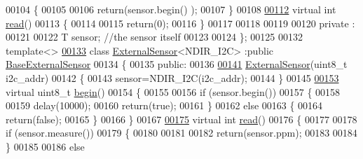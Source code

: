 \begin{DoxyCode}
00104     \{
00105 
00106         \textcolor{keywordflow}{return}(sensor.begin() );    
00107     \}
00108     
\hyperlink{class_external_sensor_a6dbf2d6b1c183740ce0f153d6e43ccb2}{00112}     \textcolor{keyword}{virtual} \textcolor{keywordtype}{int} \hyperlink{class_external_sensor_a6dbf2d6b1c183740ce0f153d6e43ccb2}{read}()
00113     \{
00114 
00115         \textcolor{keywordflow}{return}(0);
00116     \}
00117 
00118 
00119 
00120 private :
00121     
00122     T sensor; \textcolor{comment}{//the sensor itself}
00123 
00124 \};
00125 
00132 \textcolor{keyword}{template}<>
\hyperlink{class_external_sensor_3_01_n_d_i_r___i2_c_01_4}{00133} \textcolor{keyword}{class }\hyperlink{class_external_sensor}{ExternalSensor}<NDIR\_I2C> :\textcolor{keyword}{public} \hyperlink{class_base_external_sensor}{BaseExternalSensor}
00134 \{
00135 \textcolor{keyword}{public}:
00136 
\hyperlink{class_external_sensor_3_01_n_d_i_r___i2_c_01_4_aa06970ea689679c0e1deb5360e05a0a4}{00141}     \hyperlink{class_external_sensor_3_01_n_d_i_r___i2_c_01_4_aa06970ea689679c0e1deb5360e05a0a4}{ExternalSensor}(uint8\_t i2c\_addr)
00142     \{
00143         sensor=NDIR\_I2C(i2c\_addr);
00144     \}
00145     
\hyperlink{class_external_sensor_3_01_n_d_i_r___i2_c_01_4_ac6f3614d94968ef0cc11b2b4d69cef03}{00153}     \textcolor{keyword}{virtual} uint8\_t \hyperlink{class_external_sensor_3_01_n_d_i_r___i2_c_01_4_ac6f3614d94968ef0cc11b2b4d69cef03}{begin}()
00154     \{
00155 
00156          \textcolor{keywordflow}{if} (sensor.begin()) 
00157         \{
00158 
00159             delay(10000);
00160             \textcolor{keywordflow}{return}(\textcolor{keyword}{true});
00161             \}
00162          \textcolor{keywordflow}{else} 
00163         \{
00164             \textcolor{keywordflow}{return}(\textcolor{keyword}{false});
00165         \}   
00166     \}
00167     
\hyperlink{class_external_sensor_3_01_n_d_i_r___i2_c_01_4_add67f5ecaf47d2ee675e8299aee7322d}{00175}     \textcolor{keyword}{virtual} \textcolor{keywordtype}{int} \hyperlink{class_external_sensor_3_01_n_d_i_r___i2_c_01_4_add67f5ecaf47d2ee675e8299aee7322d}{read}()
00176     \{
00177 
00178         \textcolor{keywordflow}{if} (sensor.measure())
00179         \{
00180 
00181 
00182             \textcolor{keywordflow}{return}(sensor.ppm);
00183             
00184         \}
00185         
00186         \textcolor{keywordflow}{else}

\end{DoxyCode}
